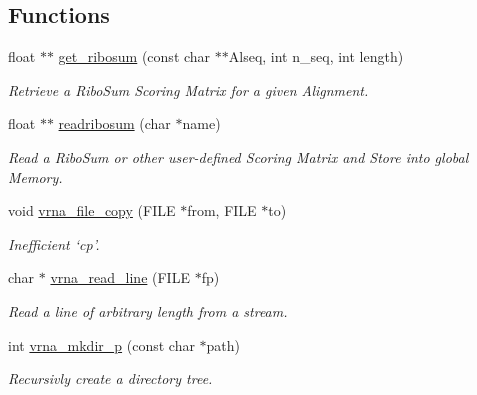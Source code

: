 \subsection*{Functions}
\begin{DoxyCompactItemize}
\item 
\mbox{\label{group__file__utils_ga1116aed4b2dab5252cd23946d47d52c3}} 
float $\ast$$\ast$ \mbox{\hyperlink{group__file__utils_ga1116aed4b2dab5252cd23946d47d52c3}{get\+\_\+ribosum}} (const char $\ast$$\ast$Alseq, int n\+\_\+seq, int length)
\begin{DoxyCompactList}\small\item\em Retrieve a Ribo\+Sum Scoring Matrix for a given Alignment. \end{DoxyCompactList}\item 
float $\ast$$\ast$ \mbox{\hyperlink{group__file__utils_ga5e125c9586fcd4e2e1559fe76f7289cc}{readribosum}} (char $\ast$name)
\begin{DoxyCompactList}\small\item\em Read a Ribo\+Sum or other user-\/defined Scoring Matrix and Store into global Memory. \end{DoxyCompactList}\item 
\mbox{\label{group__file__utils_ga4382a56d2fee9ed738364b99329edc7c}} 
void \mbox{\hyperlink{group__file__utils_ga4382a56d2fee9ed738364b99329edc7c}{vrna\+\_\+file\+\_\+copy}} (F\+I\+LE $\ast$from, F\+I\+LE $\ast$to)
\begin{DoxyCompactList}\small\item\em Inefficient `cp'. \end{DoxyCompactList}\item 
char $\ast$ \mbox{\hyperlink{group__file__utils_gad16c270b70a77c753088b29de8a802dc}{vrna\+\_\+read\+\_\+line}} (F\+I\+LE $\ast$fp)
\begin{DoxyCompactList}\small\item\em Read a line of arbitrary length from a stream. \end{DoxyCompactList}\item 
\mbox{\label{group__file__utils_gacfa44a974272a4d42c5d391cc780a0ec}} 
int \mbox{\hyperlink{group__file__utils_gacfa44a974272a4d42c5d391cc780a0ec}{vrna\+\_\+mkdir\+\_\+p}} (const char $\ast$path)
\begin{DoxyCompactList}\small\item\em Recursivly create a directory tree. \end{DoxyCompactList}\item 
$$
\end{DoxyCompactItemize}
